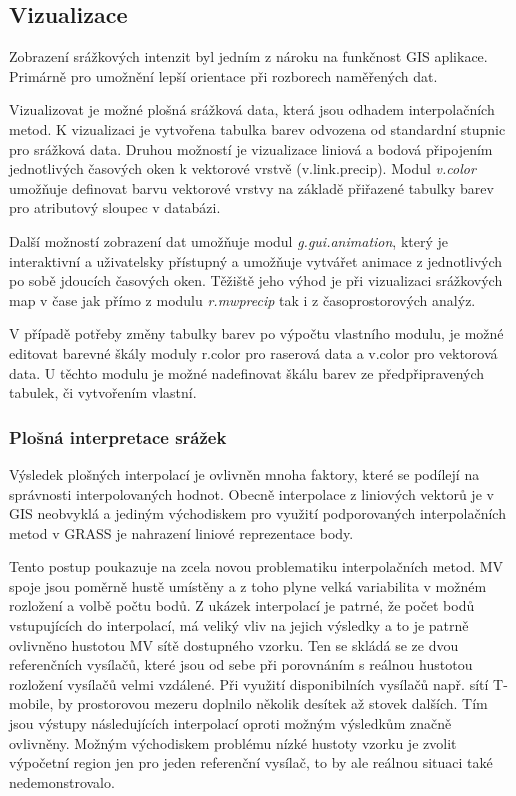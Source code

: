 \documentclass[a4paper,12pt,oneside]{report}
\begin{document}
\subsection{Vizualizace}
Zobrazení srážkových intenzit byl jedním z nároku na funkčnost GIS aplikace. Primárně pro umožnění  lepší orientace při rozborech naměřených dat.

Vizualizovat je možné plošná srážková data, která jsou odhadem interpolačních metod. K vizualizaci je vytvořena tabulka barev odvozena od standardní  stupnic pro srážková data. Druhou možností je vizualizace liniová a bodová připojením jednotlivých časových oken k vektorové vrstvě (v.link.precip). Modul \textit{v.color} umožňuje definovat barvu vektorové vrstvy na základě přiřazené tabulky barev pro atributový sloupec v databázi.

Další možností zobrazení dat umožňuje modul \textit{g.gui.animation}, který je interaktivní a uživatelsky přístupný a umožňuje vytvářet animace z jednotlivých po sobě jdoucích časových oken. Těžiště jeho výhod je při vizualizaci srážkových map v čase jak přímo z modulu \textit{r.mwprecip} tak i z časoprostorových analýz. 

V případě potřeby změny tabulky barev po výpočtu vlastního modulu, je možné editovat barevné škály moduly r.color pro raserová data a v.color pro vektorová data. U těchto modulu je možné nadefinovat škálu barev ze předpřipravených tabulek, či vytvořením vlastní.


\subsubsection{Plošná interpretace srážek}
Výsledek plošných interpolací  je ovlivněn mnoha faktory, které se podílejí na správnosti interpolovaných  hodnot. Obecně interpolace z liniových vektorů je v GIS neobvyklá a jediným východiskem pro využití podporovaných interpolačních metod v GRASS je nahrazení liniové reprezentace body.

Tento postup poukazuje na zcela novou problematiku interpolačních metod. MV spoje jsou poměrně hustě umístěny a z toho plyne velká variabilita v možném rozložení a volbě počtu bodů. Z ukázek interpolací je patrné, že počet bodů vstupujících do interpolací, má veliký vliv na jejich výsledky a to je patrně ovlivněno hustotou MV sítě dostupného vzorku. Ten se skládá se ze dvou referenčních vysílačů, které jsou od sebe při porovnáním s reálnou  hustotou rozložení vysílačů velmi vzdálené. Při využití disponibilních vysílačů např.  sítí T-mobile, by prostorovou mezeru doplnilo několik desítek až stovek dalších. Tím jsou výstupy následujících interpolací oproti možným výsledkům značně ovlivněny. Možným východiskem  problému nízké hustoty vzorku je zvolit výpočetní region jen pro jeden referenční vysílač, to by ale reálnou situaci také nedemonstrovalo.
\end{document}
